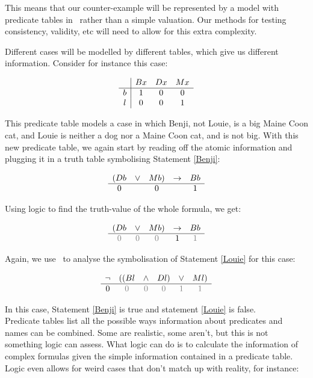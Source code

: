 \documentclass[PHIL101-Textbook.tex]{subfiles}
\begin{document}
This means that our counter-example will be represented by a model with predicate tables in \pl\, rather than a simple valuation. Our methods for testing consistency, validity, etc will need to allow for this extra complexity.

\medskip




 Different cases will be modelled by different tables, which give us different information. Consider for instance this case: 

\[\begin{array}{c|ccc}
	  &\mathord{B}{x}& \mathord{D}{x}& \mathord{M}{x}\\ \hline
	b & 1 & 0& 0\\
	l & 0 & 0 & 1
\end{array}\]

\noindent This predicate table models a case in which Benji, not Louie, is a big Maine Coon cat, and Louie is neither a dog nor a Maine Coon cat, and is not big. With this new predicate table, we again start by reading off the atomic information and plugging it in a truth table symbolising Statement \ref{Benji}: 

\[\begin{array}{ccccc}
	(\mathord{D}{b}&\vee&\mathord{M}{b})&\rightarrow& \mathord{B}{b}\\\hline
	0& & 0&& 1
\end{array}\]

\noindent Using logic to find the truth-value of the whole formula, we get:

\[\begin{array}{ccccc}
	(\atom D b&\eor&\atom Mb)&\eif& \atom Bb\\\hline
	\gF & \gF & \gF&\vT& \gT						  
\end{array}\]

\noindent Again, we use \pl\ to analyse the symbolisation of Statement \ref{Louie} for this case:

\[\begin{array}{cccccc}
	\enot &((\atom B l&\eand&\atom D l)&\eor& \atom M l)\\\hline
	\vF & \gF & \gF & \gF & \gT& \gT
\end{array} \]

\noindent In this case, Statement \ref{Benji} is true and statement \ref{Louie} is false. \\

Predicate tables list all the possible ways information about predicates and names can be combined. Some are realistic, some aren't, but this is not something logic can assess. What logic can do is to calculate the information of complex formulas given the simple information contained in a predicate table. Logic even allows for weird cases that don't match up with reality, for instance:
\end{document}
